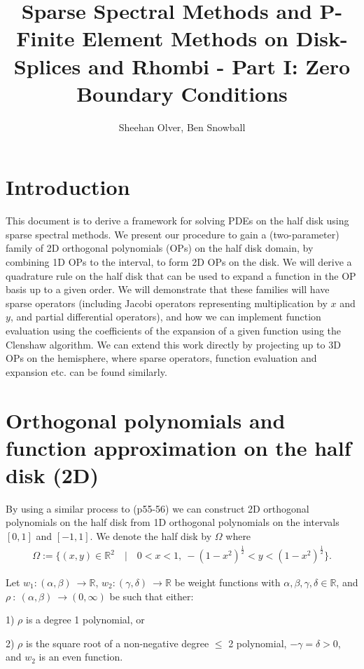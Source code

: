 \documentclass[11pt, oneside]{article}   	%
\title{Sparse Spectral Methods and P-Finite Element Methods on Disk-Splices and Rhombi - Part I: Zero Boundary Conditions}
\author{Sheehan Olver, Ben Snowball}
\newcommand{\half}{\frac{1}{2}}
\newcommand{\R}{\mathbb{R}}
\begin{document}
\maketitle



%
\section{Introduction}

This document is to derive a framework for solving PDEs on the half disk using sparse spectral methods. We present our procedure  to gain a (two-parameter) family of 2D orthogonal polynomials (OPs) on the half disk domain, by combining 1D OPs to the interval, to form 2D OPs on the disk. We will derive a quadrature rule on the half disk that can be used to expand a function in the OP basis up to a given order. We will demonstrate that these families will have sparse operators (including Jacobi operators representing multiplication by $x$ and $y$, and partial differential operators), and how we can implement function evaluation using the coefficients of the expansion of a given function using the Clenshaw algorithm. We can extend this work directly by projecting up to 3D OPs on the hemisphere, where sparse operators, function evaluation and expansion etc. can be found similarly. 

\section{Orthogonal polynomials  and function approximation on the half disk (2D)}

By using a similar process to \cite{dunkl2014orthogonal} (p55-56) we can construct 2D orthogonal polynomials on the half disk from 1D orthogonal polynomials on the intervals \([0,1]\) and \([-1,1]\). We denote the half disk by \(\Omega\) where
\begin{align}
\Omega := \{(x,y) \in \R^2 \quad | \quad 0 < x < 1, \: -(1-x^2)^{\half} < y < (1-x^2)^{\half}\}.
\end{align}

Let \(w_1 : (\alpha,\beta) \: \to \R\), \(w_2 : (\gamma,\delta) \: \to \R\) be weight functions with \(\alpha,\beta,\gamma,\delta \in \R\), and \(\rho \: : \: (\alpha,\beta) \: \to (0,\infty)\) be such that either:

1) \(\rho\) is a degree 1 polynomial, or 

2) \(\rho\) is the square root of a non-negative degree \(\le\) 2 polynomial, \(-\gamma = \delta > 0\), and \(w_2\) is an even function.
\end{document}
